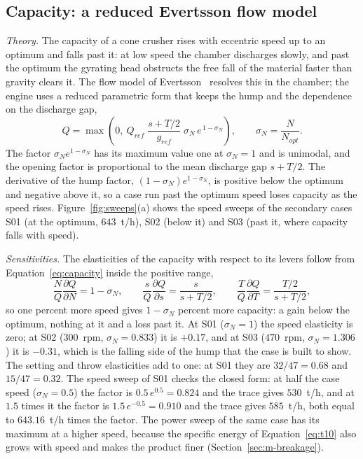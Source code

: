 \subsection{Capacity: a reduced Evertsson flow model}\label{sec:m-capacity}

\emph{Theory.} The capacity of a cone crusher rises with eccentric speed up to an optimum and falls past it: at low speed the chamber
discharges slowly, and past the optimum the gyrating head obstructs the free fall of the material faster than gravity clears it. The
flow model of Evertsson~\cite{evertsson1999,evertsson2000} resolves this in the chamber; the engine uses a reduced parametric form that
keeps the hump and the dependence on the discharge gap,
\begin{equation}
Q = \max\!\left(0,\ Q_{ref}\;\frac{s + T/2}{g_{ref}}\;\sigma_N\,e^{\,1-\sigma_N}\right),\qquad \sigma_N = \frac{N}{N_{opt}} .
\label{eq:capacity}
\end{equation}
The factor $\sigma_N e^{1-\sigma_N}$ has its maximum value one at $\sigma_N=1$ and is unimodal, and the opening factor is proportional
to the mean discharge gap $s+T/2$. The derivative of the hump factor, $(1-\sigma_N)e^{1-\sigma_N}$, is positive below the optimum and
negative above it, so a case run past the optimum speed loses capacity as the speed rises. Figure~\ref{fig:sweeps}(a) shows the speed
sweeps of the secondary cases S01 (at the optimum, $643$~t/h), S02 (below it) and S03 (past it, where capacity falls with speed).

\emph{Sensitivities.} The elasticities of the capacity with respect to its levers follow from Equation~\eqref{eq:capacity} inside the
positive range,
\begin{equation}
\frac{N}{Q}\frac{\partial Q}{\partial N} = 1 - \sigma_N,\qquad
\frac{s}{Q}\frac{\partial Q}{\partial s} = \frac{s}{s+T/2},\qquad
\frac{T}{Q}\frac{\partial Q}{\partial T} = \frac{T/2}{s+T/2},
\label{eq:elasticity}
\end{equation}
so one percent more speed gives $1-\sigma_N$ percent more capacity: a gain below the optimum, nothing at it and a loss past it. At S01
($\sigma_N=1$) the speed elasticity is zero; at S02 ($300$~rpm, $\sigma_N=0.833$) it is $+0.17$, and at S03 ($470$~rpm, $\sigma_N=1.306$) it is
$-0.31$, which is the falling side of the hump that the case is built to show. The setting and throw elasticities add to one: at S01 they are
$32/47=0.68$ and $15/47=0.32$. The speed sweep of S01 checks the closed form: at half the case speed ($\sigma_N=0.5$) the factor is
$0.5\,e^{0.5}=0.824$ and the trace gives $530$~t/h, and at $1.5$ times it the factor is $1.5\,e^{-0.5}=0.910$ and the trace gives $585$~t/h, both
equal to $643.16$~t/h times the factor. The power sweep of the same case has its maximum at a higher speed, because the specific energy of
Equation~\eqref{eq:t10} also grows with speed and makes the product finer (Section~\ref{sec:m-breakage}).

